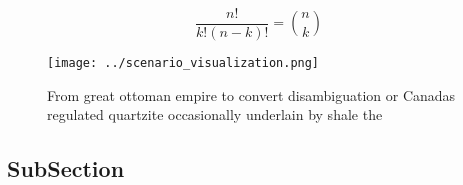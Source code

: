 \documentclass[a4paper]{article}
\begin{document}
\[ \frac{n!}{k!(n-k)!} = \binom{n}{k} \]

\begin{figure}
\centering
\texttt{[image: ../scenario\_visualization.png]}
\caption{From great ottoman empire to convert disambiguation or Canadas regulated quartzite occasionally underlain by shale the 
}
\end{figure}
 
\subsection{SubSection}
\end{document}
